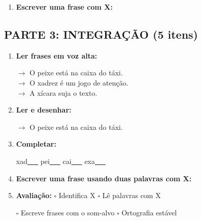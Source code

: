 \begin{exercicio}
\begin{enumerate}[resume]
  \item \textbf{Escrever uma frase com X:}
  \begin{center}
  \underline{\hspace{12cm}}
  \end{center}

\end{enumerate}

\subsection*{PARTE 3: INTEGRAÇÃO (5 itens)}

\begin{enumerate}[resume]

  \item \textbf{Ler frases em voz alta:}
  \begin{center}
  $\rightarrow$ O peixe está na caixa do táxi.\\
  $\rightarrow$ O xadrez é um jogo de atenção.\\
  $\rightarrow$ A xícara suja o texto.\\
  \end{center}

  \item \textbf{Ler e desenhar:}
  \begin{center}
  $\rightarrow$ O peixe está na caixa do táxi.
  \end{center}
  \begin{center}
  \end{center}

  \item \textbf{Completar:}
  \begin{center}
  xad\underline{~~~} \quad pei\underline{~~~} \quad cai\underline{~~~} \quad exa\underline{~~~}
  \end{center}

  \item \textbf{Escrever uma frase usando duas palavras com X:}
  \begin{center}
  \underline{\hspace{12cm}}
  \end{center}

  \item \textbf{Avaliação:} $\square$ Identifica X \quad $\square$ Lê palavras com X
  \begin{center}
  $\square$ Escreve frases com o som-alvo \quad $\square$ Ortografia estável
  \end{center}


\end{enumerate}
\end{exercicio}

